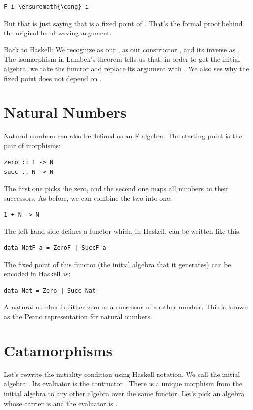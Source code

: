 \begin{Verbatim}[commandchars=\\\{\}]
F i \ensuremath{\cong} i
\end{Verbatim}
But that is just saying that  is a fixed point of .
That's the formal proof behind the original hand-waving argument.

Back to Haskell: We recognize  as our ,
 as our constructor , and its inverse as
. The isomorphism in Lambek's theorem tells us that, in
order to get the initial algebra, we take the functor  and
replace its argument  with . We also see why
the fixed point does not depend on .

\section{Natural Numbers}\label{natural-numbers}

Natural numbers can also be defined as an F-algebra. The starting point
is the pair of morphisms:

\begin{verbatim}
zero :: 1 -> N
succ :: N -> N
\end{verbatim}
The first one picks the zero, and the second one maps all numbers to
their successors. As before, we can combine the two into one:

\begin{verbatim}
1 + N -> N
\end{verbatim}
The left hand side defines a functor which, in Haskell, can be written
like this:

\begin{verbatim}
data NatF a = ZeroF | SuccF a
\end{verbatim}
The fixed point of this functor (the initial algebra that it generates)
can be encoded in Haskell as:

\begin{verbatim}
data Nat = Zero | Succ Nat
\end{verbatim}
A natural number is either zero or a successor of another number. This
is known as the Peano representation for natural numbers.

\section{Catamorphisms}\label{catamorphisms}

Let's rewrite the initiality condition using Haskell notation. We call
the initial algebra . Its evaluator is the contructor
. There is a unique morphism  from the initial
algebra to any other algebra over the same functor. Let's pick an
algebra whose carrier is  and the evaluator is .

